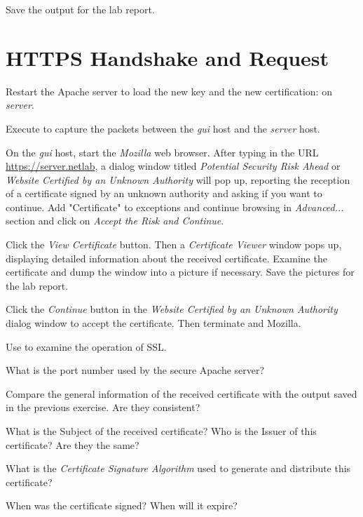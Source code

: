 \documentclass{../UTNetLab}
\begin{document}
Save the output for the lab report.

\section{HTTPS Handshake and Request}
Restart the Apache server to load the new key and the new certification:  on \textit{server}.

Execute  to capture the packets between the \textit{gui} host and the \textit{server} host.

On the \textit{gui} host, start the \textit{Mozilla} web browser.
After typing in the URL \url{https://server.netlab}, a dialog window titled \textit{Potential Security Risk Ahead} or \textit{Website Certified by an Unknown Authority} will pop up, reporting the reception of a certificate signed by an unknown authority and asking if you want to continue.
Add "Certificate" to exceptions and continue browsing in \textit{Advanced...} section and click on \textit{Accept the Risk and Continue}.

Click the \textit{View Certificate} button.
Then a \textit{Certificate Viewer} window pops up, displaying detailed information about the received certificate.
Examine the certificate and dump the window into a picture if necessary.
Save the pictures for the lab report.

Click the \textit{Continue} button in the \textit{Website Certified by an Unknown Authority} dialog window to accept the certificate.
Then terminate  and Mozilla.

Use  to examine the operation of SSL.

\begin{report}
    \item What is the port number used by the secure Apache server?

    \item Compare the general information of the received certificate with the  output saved in the previous exercise.
    Are they consistent?

    \item What is the Subject of the received certificate? Who is the Issuer of this certificate? Are they the same?

    \item What is the \textit{Certificate Signature Algorithm} used to generate and distribute this certificate?

    \item When was the certificate signed? When will it expire?
\end{report}
\end{document}
